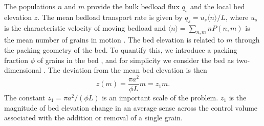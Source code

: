 The populations $n$ and $m$ provide the bulk bedload flux $q_s$ and the local bed elevation $z$.
The mean bedload transport rate is given by $q_s = u_s\langle n \rangle/L$, where $u_s$ is the characteristic velocity of moving bedload and $\langle n \rangle = 
\sum_{n,m}nP(n,m) $ is the mean number of grains in motion \citep{Charru2004, Ancey2008, Furbish2012a}.
The bed elevation is related to $m$ through the packing geometry of the bed.
To quantify this, we introduce a packing fraction $\phi$ of grains in the bed \citep{Bennett1972}, and for simplicity we consider the bed as two-dimensional \citep{Einstein1950, Paintal1971}. The deviation from the mean bed elevation is then
\begin{equation} z(m) = \frac{\pi a^2}{\phi L}m = z_1 m. \label{eq:ele}\end{equation}
The constant $z_1 = \pi a^2/(\phi L)$ is an important scale of the problem. 
$z_1$ is the magnitude of bed elevation change in an average sense across the control volume associated with the addition or removal of a single grain.

